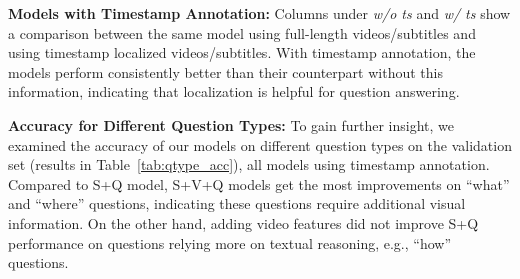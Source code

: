 \documentclass[11pt,a4paper]{article}
\begin{document}
\noindent\textbf{Models with Timestamp Annotation:} 
Columns under \textit{w/o ts} and \textit{w/ ts} show a comparison between the same model using full-length videos/subtitles and using timestamp localized videos/subtitles. 
With timestamp annotation, the models perform consistently better than their counterpart without this information, indicating that localization is 
helpful for question answering.


\noindent\textbf{Accuracy for Different Question Types:} 
To gain further insight, we examined the accuracy of our models on different question types on the validation set (results in Table~\ref{tab:qtype_acc}), all models using timestamp annotation. Compared to S+Q model, S+V+Q models get the most improvements on ``what'' and ``where'' questions, indicating these questions require additional visual information. On the other hand, adding video features did not improve S+Q performance on questions relying more on textual reasoning, e.g., ``how'' questions.


\begin{table}[ht]
\centering
{}
\caption{Accuracy on TVQA validation set with negative answers collected using different strategies. Negative Answer Source (N.A. Src.) indicates the collection method of the negative answers. Q = Question, S = Subtitle, V = Video, cpt = visual concept features, ts = timestamp annotation. All the experiments are conducted using the proposed multi-stream neural model. }
\label{tab:rand_negative}
\vspace{-5pt}
\end{table}
\end{document}
